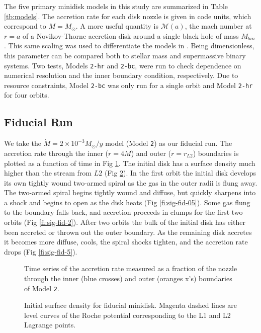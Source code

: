\documentclass{emulateapj}
\newcommand{\model}[1]{{Model \texttt{#1}}}
\begin{document}
The five primary minidisk models in this study are summarized in Table \ref{tb:models}.  The accretion rate for each disk nozzle is given in code units, which correspond to $M=M_\odot$.  A more useful quantity is $\mathcal{M}(a)$, the mach number at $r=a$ of a Novikov-Thorne accretion disk around a single black hole of mass $M_{bin}$ \citep{Novikov73}.  This same scaling was used to differentiate the models in \cite{Farris14}.  Being dimensionless, this parameter can be compared both to stellar mass and supermassive binary systems.  Two tests, Models \texttt{2-hr} and \texttt{2-bc}, were run to check dependence on numerical resolution and the inner boundary condition, respectively. Due to resource constraints, \model{2-bc} was only run for a single orbit and \model{2-hr} for four orbits.

\subsection{Fiducial Run}
\label{subsec:fiducial}

We take the $\dot{M} = 2 \times 10^{-3} M_\odot / y$ model (\model{2}) as our fiducial run.  The accretion rate through the inner ($r=4 M$) and outer ($r=r_{L2}$) boundaries is plotted as a function of time in Fig \ref{fi:mdot-fid}. The initial disk has a surface density much higher than the stream from $L2$ (Fig \ref{fi:sig-fid-0}).  In the first orbit the initial disk develops its own tightly wound two-armed spiral as the gas in the outer radii is flung away.  The two-armed spiral begins tightly wound and diffuse, but quickly sharpens into a shock and begins to open as the disk heats (Fig \ref{fi:sig-fid-05}).  Some gas flung to the boundary falls back, and accretion proceeds in clumps for the first two orbits (Fig \ref{fi:sig-fid-2}).  After two orbits the bulk of the initial disk has either been accreted or thrown out the outer boundary.  As the remaining disk accretes it becomes more diffuse, cools, the spiral shocks tighten, and the accretion rate drops (Fig \ref{fi:sig-fid-5}).

\begin{figure}
\caption{\label{fi:mdot-fid} Time series of the accretion rate measured as a fraction of the nozzle through the inner (blue crosses) and outer (oranges x's) boundaries of \model{2}.}
\end{figure}

\begin{figure}
\caption{\label{fi:sig-fid-0} Initial surface density for fiducial minidisk.  Magenta dashed lines are level curves of the Roche potential corresponding to the L1 and L2 Lagrange points.}
\end{figure}
\end{document}
